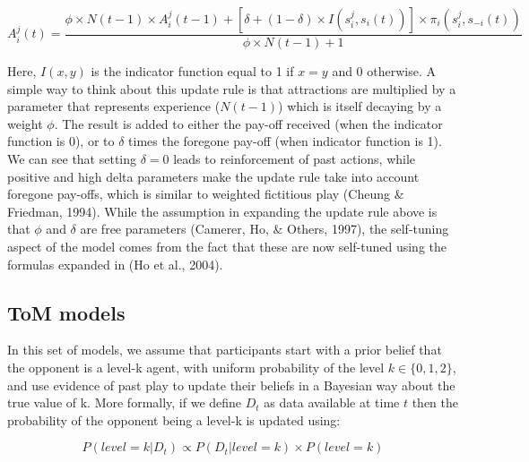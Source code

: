 \documentclass[man,floatsintext]{apa6}
\begin{document}
\[ A_{i}^{j}(t) =  \frac{\phi \times N(t-1) \times A_{i}^{j}(t-1) + [ \delta + (1-\delta) \times I(s_{i}^{j},s_{i}(t))] \times \pi_{i}(s_{i}^{j},s_{-i}(t)) } {\phi \times N(t-1) + 1} \]

Here, \(I(x,y)\) is the indicator function equal to 1 if \(x = y\) and 0 otherwise. A simple way to think about this update rule is that attractions are multiplied by a parameter that represents experience (\(N(t-1)\)) which is itself decaying by a weight \(\phi\). The result is added to either the pay-off received (when the indicator function is 0), or to \(\delta\) times the foregone pay-off (when indicator function is 1). We can see that setting \(\delta = 0\) leads to reinforcement of past actions, while positive and high delta parameters make the update rule take into account foregone pay-offs, which is similar to weighted fictitious play (Cheung \& Friedman, 1994). While the assumption in expanding the update rule above is that \(\phi\) and \(\delta\) are free parameters (Camerer, Ho, \& Others, 1997), the self-tuning aspect of the model comes from the fact that these are now self-tuned using the formulas expanded in (Ho et al., 2004).

\hypertarget{tom-models}{%
\subsection{ToM models}\label{tom-models}}

In this set of models, we assume that participants start with a prior belief that the opponent is a level-k agent, with uniform probability of the level \(k \in \{ 0, 1, 2\}\), and use evidence of past play to update their beliefs in a Bayesian way about the true value of k. More formally, if we define \(D_{t}\) as data available at time \(t\) then the probability of the opponent being a level-k is updated using:

\[ P(level=k | D_{t})  \propto  P(D_{t}|level=k ) \times P(level=k)\]
\end{document}

